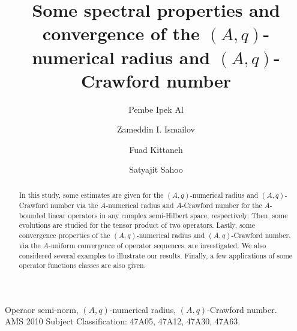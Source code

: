 \documentclass[preprint,12pt,3p]{elsarticle}
\begin{document}
\begin{frontmatter}
		\title{  Some spectral properties and convergence of the $ (A,q)$-numerical radius and $ (A,q)$-Crawford number }

\author[label1]{Pembe Ipek Al}
			
			 \address[label1]{Department of Mathematics, Faculty of Sciences, Karadeniz Technical University,
Trabzon, 61080 Turkey}
\author[label1]{Zameddin I. Ismailov}
			

  
			 \author[label3]{Fuad Kittaneh}
			
			 \address[label3]{Department of Mathematics, The University of Jordan, Amman, Jordan}
		
		\author[label4]{Satyajit Sahoo}
		
	
		
		\address[label4]{School of Mathematical Sciences, National Institute of Science Education and Research, Bhubaneswar, India}
		
	
		
		
		
		
		\begin{abstract}
							In this study, some estimates are given for the $ (A,q)$-numerical radius and $ (A,q)$-Crawford number via the $ A$-numerical radius and $ A$-Crawford number for the $ A $-bounded linear operators in any complex semi-Hilbert space, respectively. Then, some evolutions are studied for the tensor product of two operators. Lastly, some convergence properties of the $ (A,q)$-numerical radius and $ (A,q)$-Crawford number, via the $ A$-uniform convergence of operator sequences, are investigated. We also considered several examples to illustrate our results. Finally, a few applications of some operator functions classes are also given.
		\end{abstract}
		
		\begin{keyword}
			Operaor semi-norm, $ (A,q) $-numerical radius, $ (A,q)$-Crawford number.\\
   AMS 2010 Subject Classification: 47A05, 47A12, 47A30, 47A63.
		\end{keyword}
    
	\end{frontmatter}
\end{document}
